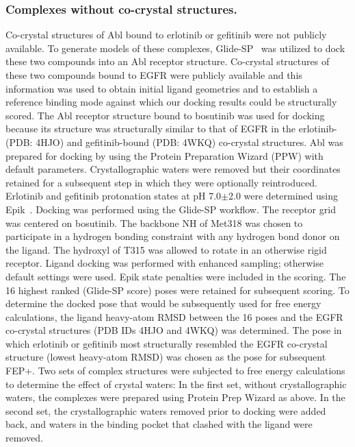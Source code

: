 \documentclass[phd,tocprelim]{cornell}
\begin{document}
\subsubsection{Complexes without co-crystal structures.}
Co-crystal structures of Abl bound to erlotinib or gefitinib were not publicly available. To generate models of these complexes, Glide-SP~\citep{Friesner:J.Med.Chem.:2004} was utilized to dock these two compounds into an Abl receptor structure. 
Co-crystal structures of these two compounds bound to EGFR were publicly available and this information was used to obtain initial ligand geometries and to establish a reference binding mode against which our docking results could be structurally scored.    
The Abl receptor structure bound to bosutinib was used for docking because its structure was structurally similar to that of EGFR in the erlotinib- (PDB: 4HJO) \citep{Park:Biochem.J.:2012} and gefitinib-bound (PDB: 4WKQ) \citep{Yosaatmadja::2014} co-crystal structures. 
Abl was prepared for docking by using the Protein Preparation Wizard (PPW) with default parameters. 
Crystallographic waters were removed but their coordinates retained for a subsequent step in which they were optionally reintroduced. 
Erlotinib and gefitinib protonation states at pH 7.0$\pm$2.0 were determined using Epik~\citep{Shelley:J.Comput.AidedMol.Des.:2007}.
Docking was performed using the Glide-SP workflow. 
The receptor grid was centered on bosutinib. 
The backbone NH of Met318 was chosen to participate in a hydrogen bonding constraint with any hydrogen bond donor on the ligand. 
The hydroxyl of T315 was allowed to rotate in an otherwise rigid receptor. Ligand docking was performed with enhanced sampling; otherwise default settings were used. Epik state penalties were included in the scoring. The 16 highest ranked (Glide-SP score) poses were retained for subsequent scoring. 
To determine the docked pose that would be subsequently used for free energy calculations, the ligand heavy-atom RMSD between the 16 poses and the EGFR co-crystal structures (PDB IDs 4HJO and 4WKQ) was determined. 
The pose in which erlotinib or gefitinib most structurally resembled the EGFR co-crystal structure (lowest heavy-atom RMSD) was chosen as the pose for subsequent FEP+. 
Two sets of complex structures were subjected to free energy calculations to determine the effect of crystal waters: In the first set, without crystallographic waters, the complexes were prepared using Protein Prep Wizard as above. 
In the second set, the crystallographic waters removed prior to docking were added back, and waters in the binding pocket that clashed with the ligand were removed. 
\end{document}
